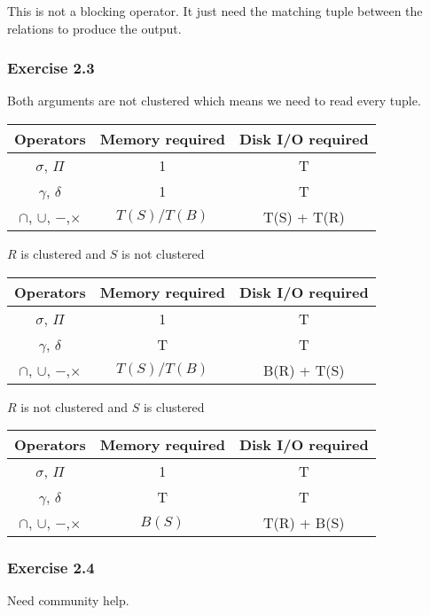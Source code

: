 \documentclass[../../main.tex]{subfiles}
\begin{document}
This is not a blocking operator. It just need the matching tuple between
the relations to produce the output.

\subsubsection*{Exercise 2.3}

Both arguments are not clustered which means we need to read every tuple.

\begin{table}[H]
  \centering
  \begin{tabular}{@{}ccc@{}}
  \toprule
  Operators                      & Memory required  & Disk I/O required \\ \midrule
  $\sigma$, $\Pi$                &   1              &        T          \\
  $\gamma$, $\delta$             &   1              &        T          \\
  $\cap$, $\cup$, $-$,$\times$   &   $T(S) / T(B)$  &     T(S) + T(R)   \\ \bottomrule
  \end{tabular}
\end{table}

$R$ is clustered and $S$ is not clustered

\begin{table}[H]
  \centering
  \begin{tabular}{@{}ccc@{}}
  \toprule
  Operators                      & Memory required  & Disk I/O required \\ \midrule
  $\sigma$, $\Pi$                &   1              &        T          \\
  $\gamma$, $\delta$             &   T              &        T          \\
  $\cap$, $\cup$, $-$,$\times$   &   $T(S) / T(B)$  &     B(R) + T(S)   \\ \bottomrule
  \end{tabular}
\end{table}

$R$ is not clustered and $S$ is clustered

\begin{table}[H]
  \centering
  \begin{tabular}{@{}ccc@{}}
  \toprule
  Operators                      & Memory required  & Disk I/O required \\ \midrule
  $\sigma$, $\Pi$                &   1              &        T          \\
  $\gamma$, $\delta$             &   T              &        T          \\
  $\cap$, $\cup$, $-$,$\times$   &   $B(S)$         &     T(R) + B(S)   \\ \bottomrule
  \end{tabular}
\end{table}


\subsubsection*{Exercise 2.4}

Need community help.
\end{document}
